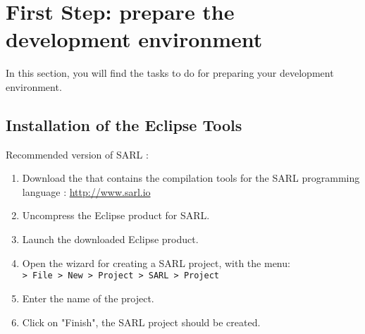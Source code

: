 \section{First Step: prepare the development environment}

In this section, you will find the tasks to do for preparing your development environment.

\subsection{Installation of the Eclipse Tools}

\begin{emphbox}
Recommended version of SARL : \sarlversion
\end{emphbox}

\begin{enumerate}
\item Download the  that contains the compilation tools for the SARL programming language : \url{http://www.sarl.io}
\item Uncompress the Eclipse product for SARL.
\item Launch the downloaded Eclipse product.
\item Open the wizard for creating a SARL project, with the menu: \\
	\texttt{> File > New > Project > SARL > Project}
\item Enter the name of the project.
\item Click on "Finish", the SARL project should be created.
\end{enumerate}

